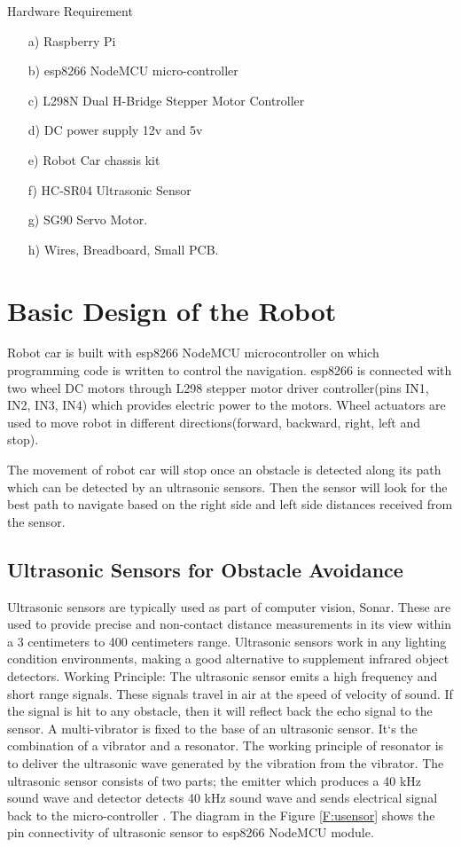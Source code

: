 \documentclass[sigconf]{acmart}
\begin{document}
Hardware Requirement
\begin{itemize}
\item[a)] Raspberry Pi
\item[b)] esp8266 NodeMCU micro-controller
\item[c)] L298N Dual H-Bridge Stepper Motor Controller
\item[d)] DC power supply 12v and 5v
\item[e)] Robot Car chassis kit
\item[f)] HC-SR04 Ultrasonic Sensor
\item[g)] SG90 Servo Motor.
\item[h)] Wires, Breadboard, Small PCB.
\end{itemize}


\section{Basic Design of the Robot}
Robot car is built with esp8266 NodeMCU microcontroller on which programming code is written to control the navigation. esp8266 is connected with two wheel DC motors through L298 stepper motor driver controller(pins IN1, IN2, IN3, IN4) which provides electric power to the motors. Wheel actuators are used to move robot in different directions(forward, backward, right, left and stop).

The movement of robot car will stop once an obstacle is detected along its path which can be detected by an ultrasonic sensors. Then the sensor will look for the best path to navigate based on the right side and left side distances received from the sensor.

\subsection{Ultrasonic Sensors for Obstacle Avoidance}
Ultrasonic sensors are typically used as part of computer vision, Sonar. These are used to provide precise and non-contact distance measurements in its view within a 3 centimeters to 400 centimeters range. Ultrasonic sensors work in any lighting condition environments, making a good alternative to supplement infrared object detectors.
Working Principle: The ultrasonic sensor emits a high frequency and short range signals. These signals travel in air at the speed of velocity of sound. If the signal is hit to any obstacle, then it will reflect back the echo signal to the sensor. A multi-vibrator is fixed to the base of an ultrasonic sensor. It`s the combination of a vibrator and a resonator. The working principle of resonator is to  deliver the  ultrasonic wave generated by the vibration from the vibrator. The ultrasonic sensor consists of two parts; the emitter which produces a 40 kHz sound wave and detector detects 40 kHz sound wave and sends electrical signal back to the micro-controller \cite{ijedr2016}. The diagram in the Figure \ref{F:usensor} shows the pin connectivity of ultrasonic sensor to esp8266 NodeMCU module.
\end{document}
